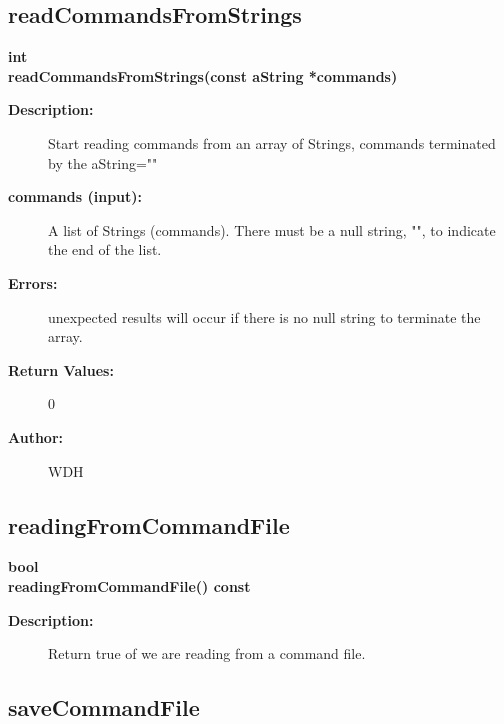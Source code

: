 \subsection{readCommandsFromStrings}
 
\begin{flushleft} \textbf{%
int  \\ 
\settowidth{\GenericGraphicsInterfaceIncludeArgIndent}{readCommandsFromStrings(}%
readCommandsFromStrings(const aString *commands)
}\end{flushleft}
\begin{description}
\item[{\bf Description:}] 
    Start reading commands from an array of Strings, commands terminated by the aString=""
\item[{\bf commands (input):}]  A list of Strings (commands). There must be a null string, "",
       to indicate the end of the list.
\item[{\bf Errors:}]  unexpected results will occur if there is no null string to terminate the array.
\item[{\bf Return Values:}]  0

\item[{\bf Author:}]  WDH
\end{description}
\subsection{readingFromCommandFile}
 
\begin{flushleft} \textbf{%
bool  \\ 
\settowidth{\GenericGraphicsInterfaceIncludeArgIndent}{readingFromCommandFile(}%
readingFromCommandFile() const 
}\end{flushleft}
\begin{description}
\item[{\bf Description:}] 
  Return true of we are reading from a command file.
 
\end{description}
\subsection{saveCommandFile}
 
